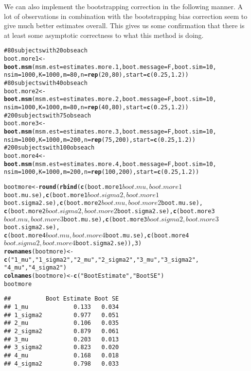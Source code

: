 \documentclass{article}\usepackage{graphicx, color}
\makeatletter
\newcommand{\hlfunctioncall}[1]{\textcolor[rgb]{0.501960784313725,0,0.329411764705882}{\textbf{#1}}}%
\newcommand{\hlstring}[1]{\textcolor[rgb]{0.6,0.6,1}{#1}}%
\newcommand{\hlcomment}[1]{\textcolor[rgb]{0.180392156862745,0.6,0.341176470588235}{#1}}%
\newenvironment{kframe}{%
 \def\at@end@of@kframe{}%
 \ifinner\ifhmode%
  \def\at@end@of@kframe{\end{minipage}}%
  \begin{minipage}{\columnwidth}%
 \fi\fi%
 \def\FrameCommand##1{\hskip\@totalleftmargin \hskip-\fboxsep
 \colorbox{shadecolor}{##1}\hskip-\fboxsep
     \hskip-\linewidth \hskip-\@totalleftmargin \hskip\columnwidth}%
 \MakeFramed {\advance\hsize-\width
   \@totalleftmargin\z@ \linewidth\hsize
   \@setminipage}}%
 {\par\unskip\endMakeFramed%
 \at@end@of@kframe}
\newenvironment{knitrout}{}{} %
\makeatother
\begin{document}
We can also implement the bootstrapping correction in the following manner.
A lot of observations in combination with the bootstrapping bias correction seem to give much better estimates overall.  This gives us some confirmation that there is at least some asymptotic correctness to what this method is doing.
\begin{knitrout}\footnotesize
{}\color{fgcolor}\begin{kframe}
\begin{alltt}
\hlcomment{# 80 subjects with 20 obs each}
boot.more1 <- \hlfunctioncall{boot.msm}(msm.est = estimates.more.1, boot.message = F, boot.sim = 10, 
    nsim = 1000, K = 1000, m = 80, n = \hlfunctioncall{rep}(20, 80), start = \hlfunctioncall{c}(0.25, 1.2))
\hlcomment{# 80 subjects with 40 obs each}
boot.more2 <- \hlfunctioncall{boot.msm}(msm.est = estimates.more.2, boot.message = F, boot.sim = 10, 
    nsim = 1000, K = 1000, m = 80, n = \hlfunctioncall{rep}(40, 80), start = \hlfunctioncall{c}(0.25, 1.2))
\hlcomment{# 200 subjects with 75 obs each}
boot.more3 <- \hlfunctioncall{boot.msm}(msm.est = estimates.more.3, boot.message = F, boot.sim = 10, 
    nsim = 1000, K = 1000, m = 200, n = \hlfunctioncall{rep}(75, 200), start = \hlfunctioncall{c}(0.25, 1.2))
\hlcomment{# 200 subjects with 100 obs each}
boot.more4 <- \hlfunctioncall{boot.msm}(msm.est = estimates.more.4, boot.message = F, boot.sim = 10, 
    nsim = 1000, K = 1000, m = 200, n = \hlfunctioncall{rep}(100, 200), start = \hlfunctioncall{c}(0.25, 1.2))

bootmore <- \hlfunctioncall{round}(\hlfunctioncall{rbind}(\hlfunctioncall{c}(boot.more1$boot.mu, boot.more1$boot.mu.se), \hlfunctioncall{c}(boot.more1$boot.sigma2, 
    boot.more1$boot.sigma2.se), \hlfunctioncall{c}(boot.more2$boot.mu, boot.more2$boot.mu.se), 
    \hlfunctioncall{c}(boot.more2$boot.sigma2, boot.more2$boot.sigma2.se), \hlfunctioncall{c}(boot.more3$boot.mu, 
        boot.more3$boot.mu.se), \hlfunctioncall{c}(boot.more3$boot.sigma2, boot.more3$boot.sigma2.se), 
    \hlfunctioncall{c}(boot.more4$boot.mu, boot.more4$boot.mu.se), \hlfunctioncall{c}(boot.more4$boot.sigma2, 
        boot.more4$boot.sigma2.se)), 3)
\hlfunctioncall{rownames}(bootmore) <- \hlfunctioncall{c}(\hlstring{"1_mu"}, \hlstring{"1_sigma2"}, \hlstring{"2_mu"}, \hlstring{"2_sigma2"}, \hlstring{"3_mu"}, \hlstring{"3_sigma2"}, 
    \hlstring{"4_mu"}, \hlstring{"4_sigma2"})
\hlfunctioncall{colnames}(bootmore) <- \hlfunctioncall{c}(\hlstring{"Boot Estimate"}, \hlstring{"Boot SE"})
bootmore
\end{alltt}
\begin{verbatim}
##          Boot Estimate Boot SE
## 1_mu             0.133   0.034
## 1_sigma2         0.977   0.051
## 2_mu             0.106   0.035
## 2_sigma2         0.879   0.061
## 3_mu             0.203   0.013
## 3_sigma2         0.823   0.020
## 4_mu             0.168   0.018
## 4_sigma2         0.798   0.033
\end{verbatim}
\end{kframe}
\end{knitrout}
\end{document}
